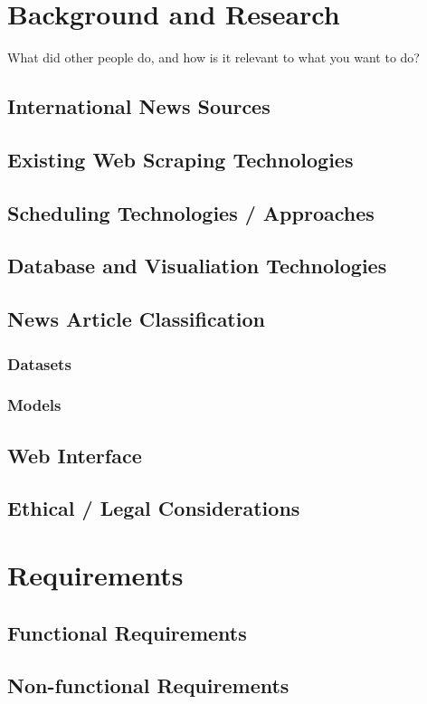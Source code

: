 \documentclass{l4proj}
\begin{document}
\chapter{Background and Research}
What did other people do, and how is it relevant to what you want to do?
\section{International News Sources}
\section{Existing Web Scraping Technologies}
\section{Scheduling Technologies / Approaches}
\section{Database and Visualiation Technologies}
\section{News Article Classification}
\subsection{Datasets}
\subsection{Models}
\section{Web Interface}
\section{Ethical / Legal Considerations}


\chapter{Requirements}
\section{Functional Requirements}
\section{Non-functional Requirements}
\end{document}
